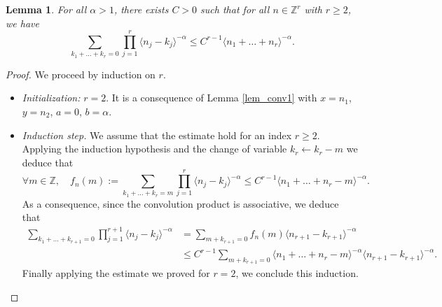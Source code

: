 \documentclass[11pt]{article}
\newtheorem{lemma}[theorem]{Lemma}
\theoremstyle{definition}
\begin{document}
\begin{lemma}
\label{lemma_convol}
For all $\alpha>1$, there exists $C>0$ such that for all $n\in \mathbb{Z}^r$ with $r\geq 2$, we have
\[
\sum_{k_1+\dots+k_r = 0} \prod_{j=1}^r \langle n_j - k_j \rangle^{-\alpha} \leq C^{r-1} \langle n_1 + \dots + n_r \rangle^{-\alpha}.
\]
\end{lemma}
\begin{proof} We proceed by induction on $r$.
\begin{itemize}
\item
\emph{Initialization:} $r =2$. It is a consequence of Lemma \ref{lem_conv1} with $x= n_1$, $y=n_2$, $a=0$, $b=\alpha$.

\item
\emph{Induction step.} We assume that the estimate hold for an index $r\geq 2$. Applying the induction hypothesis and the change of variable $k_r \leftarrow k_r-m$ we deduce that
\[
\forall m \in \mathbb{Z}, \quad f_n(m):=\sum_{k_1+\dots+k_r = m} \prod_{j=1}^r \langle n_j - k_j \rangle^{-\alpha} \leq C^{r-1} \langle n_1 + \dots + n_r -m \rangle^{-\alpha}.
\]
As a consequence, since the convolution product is associative, we deduce that
\begin{equation*}
\begin{split}
\sum_{k_1+\dots+k_{r+1} = 0} \prod_{j=1}^{r+1} \langle n_j - k_j \rangle^{-\alpha} &= \sum_{m+k_{r+1} = 0} f_n(m) \langle n_{r+1} - k_{r+1} \rangle^{-\alpha} \\
&\leq C^{r-1} \! \! \sum_{m+k_{r+1} = 0} \! \! \langle n_1 + \dots + n_r -m \rangle^{-\alpha} \langle n_{r+1} - k_{r+1} \rangle^{-\alpha}.
\end{split}
\end{equation*}
Finally applying the estimate we proved for $r=2$, we conclude this induction.\qedhere
\end{itemize}
\end{proof}
\end{document}
